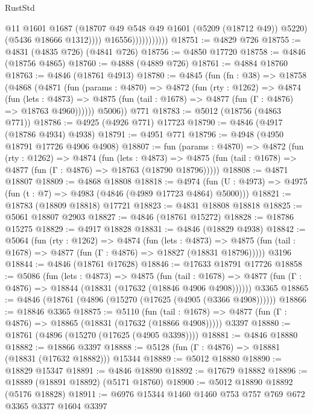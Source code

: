 \begin{lexlean}{RustStd}
\begin{coremodule}
                                @11
                                @1601
                                @1687
                                (@18707 @49 @548 @49 @1601 (@5209 (@18712 @49)) @5220)
                                (@5436 @18666 @1312))))
                          @16556)))))))))))
@18751 := @4829 @726
@18755 := @4831 (@4835 @726) (@4841 @726)
@18756 := @4850 @17720
@18758 := @4846 (@18756 @4865)
@18760 := @4888 (@4889 @726)
@18761 := @4884 @18760
@18763 := @4846 (@18761 @4913)
@18780 := @4845
    (fun (fn : @38) =>
    @18758
      (@4868
        (@4871
          (fun (params : @4870) =>
          @4872
            (fun (rty : @1262) =>
            @4874
              (fun (lets : @4873) =>
              @4875 (fun (tail : @1678) => @4877 (fun (Γ : @4876) => @18763 @4960))))))
        @5006))
    @771
@18783 := @5012 (@18756 (@4863 @771))
@18786 := @4925 (@4926 @771) @17723
@18790 := @4846 (@4917 (@18786 @4934) @4938)
@18791 := @4951 @771
@18796 := @4948 (@4950 @18791 @17726 @4906 @4908)
@18807 := fun (params : @4870) =>
  @4872
    (fun (rty : @1262) =>
    @4874
      (fun (lets : @4873) =>
      @4875 (fun (tail : @1678) => @4877 (fun (Γ : @4876) => @18763 (@18790 @18796)))))
@18808 := @4871 @18807
@18809 := @4868 @18808
@18818 := @4974
    (fun (U : @4973) => @4975 (fun (t : @7) => @4983 (@4846 (@4989 @17723 @4864) @5000)))
@18821 := @18783 (@18809 @18818) @17721
@18823 := @4831 @18808 @18818
@18825 := @5061 @18807 @2903
@18827 := @4846 (@18761 @15272)
@18828 := @18786 @15275
@18829 := @4917 @18828
@18831 := @4846 (@18829 @4938)
@18842 := @5064
    (fun (rty : @1262) =>
    @4874
      (fun (lets : @4873) =>
      @4875 (fun (tail : @1678) => @4877 (fun (Γ : @4876) => @18827 (@18831 @18796)))))
    @3196
@18844 := @4846 (@18761 @17628)
@18846 := @17633 @18791 @17726
@18858 := @5086
    (fun (lets : @4873) =>
    @4875
      (fun (tail : @1678) =>
      @4877 (fun (Γ : @4876) => @18844 (@18831 (@17632 (@18846 @4906 @4908))))))
    @3365
@18865 := @4846 (@18761 (@4896 (@15270 (@17625 (@4905 (@3366 @4908))))))
@18866 := @18846 @3365
@18875 := @5110
    (fun (tail : @1678) => @4877 (fun (Γ : @4876) => @18865 (@18831 (@17632 (@18866 @4908)))))
    @3397
@18880 := @18761 (@4896 (@15270 (@17625 (@4905 @3398))))
@18881 := @4846 @18880
@18882 := @18866 @3397
@18888 := @5128 (fun (Γ : @4876) => @18881 (@18831 (@17632 @18882))) @15344
@18889 := @5012 @18880
@18890 := @18829 @15347
@18891 := @4846 @18890
@18892 := @17679 @18882
@18896 := @18889 (@18891 @18892) (@5171 @18760)
@18900 := @5012 @18890 @18892 (@5176 @18828)
@18911 := @6976 @15344 @1460 @1460 @753 @757 @769 @672 @3365 @3377 @1604 @3397

\end{coremodule}
\end{lexlean}
